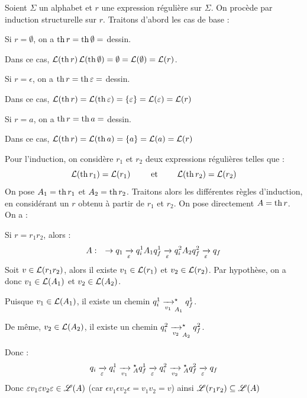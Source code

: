 \documentclass[a4paper,french,bookmarks]{book}
\begin{document}
    \begin{nproof}
        Soient $\Sigma$ un alphabet et $r$ une expression régulière sur $\Sigma$. On procède par induction structurelle sur $r$. Traitons d'abord les cas de base :
        \begin{enumerate}
            \itt Si $r = \emptyset$, on a $\th r = \th \emptyset = $ dessin.
            
            Dans ce cas, $\bcL\p{\th r}\bcL\p{\th \emptyset} = \emptyset = \bcL\p{\emptyset} = \bcL\p{r}$.
            
            \itt Si $r = \epsilon$, on a $\th r = \th \epsilon = $ dessin.
            
            Dans ce cas, $\bcL\p{\th r} = \bcL \p{\th \epsilon} = \ens{\epsilon} = \bcL\p{\epsilon} = \bcL\p{r}$
            
            \itt Si $r = a$, on a $\th r = \th a = $ dessin.
            
            Dans ce cas, $\bcL\p{\th r} = \bcL \p{\th a} = \ens{a} = \bcL\p{a} = \bcL\p{r}$
        \end{enumerate}
        Pour l'induction, on considère $r_1$ et $r_2$ deux expressions régulières telles que :
        \[ \bcL\p{\th r_1} = \bcL\p{r_1} \qquad\et\qquad \bcL\p{\th r_2} = \bcL\p{r_2} \]
        On pose $A_1 = \th r_1$ et $A_2 = \th r_2$. Traitons alors les différentes règles d'induction, en considérant un $r$ obtenu à partir de $r_1$ et $r_2$. On pose directement $A = \th r$. On a :
        \begin{enumerate}
            \itt Si $r = r_1r_2$, alors :
            \[ A :\quad \to q_1 \lima{\epsilon} q_i^1 A_1 q_f^1 \lima{\epsilon} q_i^2 A_2 q_f^2 \lima{\epsilon} q_f\]
            Soit $v \in \mathcal{L}\!\left(r_1r_2\right)$, alors il existe $v_1 \in \mathcal{L}\!\left(r_1\right)$ et $v_2 \in \mathcal{L}\!\left(r_2\right)$. Par hypothèse, on a donc $v_1 \in \mathcal{L}\!\left(A_1\right)$ et $v_2 \in \mathcal{L}\!\left(A_2\right)$.
            
            Puisque $v_1 \in \mathcal{L}\!\left(A_1\right)$, il existe un chemin $q_i^1 \lima{v_1}_{A_1}^\star q_f^1$.
            
            De même, $v_2 \in \mathcal{L}\!\left(A_2\right)$, il existe un chemin $q_i^2 \lima{v_2}_{A_2}^\star q_f^2$.
            
            Donc :
            \[ q_i \lima{\epsilon} q_i^1 \lima{v_1}{}_A^\star q_f^1 \lima{\epsilon}  q_i^2 \lima{v_2}{}_A^\star q_f^2 \lima{\epsilon}  q_f\]
            Donc $\varepsilon v_1 \varepsilon v_2 \varepsilon \in \mathscr{L} \!\left(A\right)$
        (car $\epsilon v_1 \epsilon v_2 \epsilon = v_1 v_2 = v$)
        ainsi $\mathscr{L}\!\left(r_1r_2\right) \subseteq \mathscr{L}(A)$ 
            

\end{enumerate}
\end{nproof}
\end{document}

